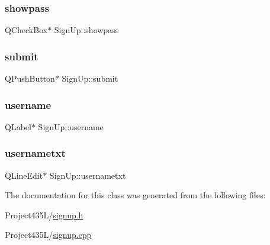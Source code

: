 \mbox{\label{classSignUp_ac466869c89fe53445de505714c341837}} 
\subsubsection{\texorpdfstring{showpass}{showpass}}
{\footnotesize\ttfamily Q\+Check\+Box$\ast$ Sign\+Up\+::showpass}

\mbox{\label{classSignUp_aa733427c622c970bb273768fe266cda6}} 
\subsubsection{\texorpdfstring{submit}{submit}}
{\footnotesize\ttfamily Q\+Push\+Button$\ast$ Sign\+Up\+::submit}

\mbox{\label{classSignUp_a00167b330798998c3d6575de385ad652}} 
\subsubsection{\texorpdfstring{username}{username}}
{\footnotesize\ttfamily Q\+Label$\ast$ Sign\+Up\+::username}

\mbox{\label{classSignUp_aeb3e4f68bd046de6788617cd8326a69c}} 
\subsubsection{\texorpdfstring{usernametxt}{usernametxt}}
{\footnotesize\ttfamily Q\+Line\+Edit$\ast$ Sign\+Up\+::usernametxt}



The documentation for this class was generated from the following files\+:\begin{DoxyCompactItemize}
\item 
Project435\+L/\hyperlink{signup_8h}{signup.\+h}\item 
Project435\+L/\hyperlink{signup_8cpp}{signup.\+cpp}\end{DoxyCompactItemize}
